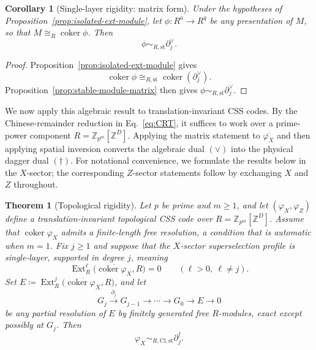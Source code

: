 \documentclass[aps,prx,english,superscriptaddress,twocolumn,tightenlines,showpacs,longbibliography,floatfix,amsfonts]{revtex4-2}
\newtheorem{theorem}{Theorem}
\newtheorem{corollary}{Corollary}
\theoremstyle{remark}
\theoremstyle{definition}
\begin{document}
\begin{corollary}[Single-layer rigidity: matrix form]
	\label{cor:isolated-ext-matrix}
	Under the hypotheses of Proposition~\ref{prop:isolated-ext-module}, let $\phi\colon R^a\to R^q$ be any presentation of $M$, so that $M\cong_R\operatorname{coker}\phi$. Then
	\begin{equation}
		\phi\sim_{R,\mathrm{st}}\partial_j^\vee.
	\end{equation}
\end{corollary}

\begin{proof}
	Proposition~\ref{prop:isolated-ext-module} gives
	\begin{equation}
		\operatorname{coker}\phi
		\cong_{R,\mathrm{st}}
		\operatorname{coker}(\partial_j^\vee).
	\end{equation}
	Proposition~\ref{prop:stable-module-matrix} then gives $\phi\sim_{R,\mathrm{st}}\partial_j^\vee$.
\end{proof}

We now apply this algebraic result to translation-invariant CSS codes. By the
Chinese-remainder reduction in Eq.~\eqref{eq:CRT}, it suffices to work over a
prime-power component \(R=\mathbb Z_{p^m}[\mathbb Z^D]\). Applying the matrix
statement to \(\overline{\varphi_X}\) and then applying spatial inversion
converts the algebraic dual \((\vee)\) into the physical dagger dual
\((\dagger)\). For notational convenience, we formulate the results below in
the \(X\)-sector; the corresponding \(Z\)-sector statements follow by
exchanging \(X\) and \(Z\) throughout.

\begin{theorem}[Topological rigidity]
	\label{thm:topological-rigidity}
	Let $p$ be prime and $m\geq 1$, and let $(\varphi_X,\varphi_Z)$ define a translation-invariant topological CSS code over
	$R=\mathbb{Z}_{p^m}[\mathbb{Z}^D]$.
	Assume that $\operatorname{coker}\varphi_X$ admits a finite-length free resolution, a condition that is automatic when $m=1$. Fix $j\geq 1$ and suppose that the \(X\)-sector superselection profile is single-layer, supported in degree $j$, meaning
	\begin{equation}
		\operatorname{Ext}_R^\ell
		\bigl(\overline{\operatorname{coker}\varphi_X},R\bigr)=0
		\qquad (\ell>0,\ \ell\neq j).
	\end{equation}
	Set
	$E\coloneqq \operatorname{Ext}_R^j
		\bigl(\overline{\operatorname{coker}\varphi_X},R\bigr)$,
	and let
	\begin{equation}
		G_j\xrightarrow{\partial_j}G_{j-1}
		\longrightarrow\cdots\longrightarrow
		G_0\longrightarrow E\longrightarrow0
	\end{equation}
	be any partial resolution of $E$ by finitely generated free
	$R$-modules, exact except possibly at $G_j$. Then
	\begin{equation}
		\varphi_X\sim_{R,\mathrm{Cl},\mathrm{st}}\partial_j^\dagger. \label{eq:rigidity}
	\end{equation}
\end{theorem}
\end{document}
